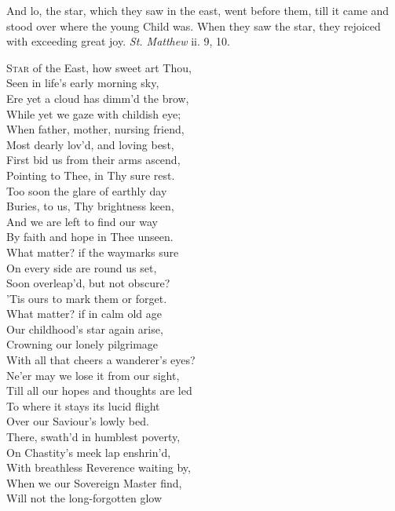 
And lo, the star, which they saw in the east, went before them, till it came and stood over where the young Child was. When they saw the star, they rejoiced with exceeding great joy. \emph{St. Matthew} ii. 9, 10.

\textsc{Star} of the East, how sweet art Thou, \\
 Seen in life’s early morning sky, \\
 Ere yet a cloud has dimm’d the brow, \\
 While yet we gaze with childish eye; \\
  When father, mother, nursing friend, \\
 Most dearly lov’d, and loving best, \\
 First bid us from their arms ascend, \\
 Pointing to Thee, in Thy sure rest. \\
  Too soon the glare of earthly day \\
 Buries, to us, Thy brightness keen, \\
 And we are left to find our way \\
 By faith and hope in Thee unseen. \\
  What matter? if the waymarks sure \\
 On every side are round us set, \\
 Soon overleap’d, but not obscure? \\
 ’Tis ours to mark them or forget. \\
  What matter? if in calm old age \\
 Our childhood’s star again arise, \\
 Crowning our lonely pilgrimage \\
 With all that cheers a wanderer’s eyes? \\
  Ne’er may we lose it from our sight, \\
 Till all our hopes and thoughts are led \\
 To where it stays its lucid flight \\
 Over our Saviour’s lowly bed. \\
  There, swath’d in humblest poverty, \\
 On Chastity’s meek lap enshrin’d, \\
 With breathless Reverence waiting by, \\
 When we our Sovereign Master find, \\
  Will not the long-forgotten glow \\
